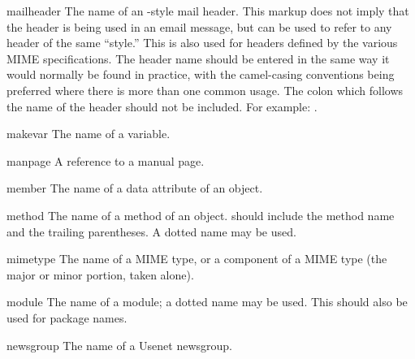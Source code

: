 \documentclass{howto}
\begin{document}
    \begin{macrodesc}{mailheader}{}
      The name of an -style mail header.  This markup does
      not imply that the header is being used in an email message, but
      can be used to refer to any header of the same ``style.''  This
      is also used for headers defined by the various MIME
      specifications.  The header name should be entered in the same
      way it would normally be found in practice, with the
      camel-casing conventions being preferred where there is more
      than one common usage.  The colon which follows the name of the
      header should not be included.
      For example: .
    \end{macrodesc}

    \begin{macrodesc}{makevar}{}
      The name of a  variable.
    \end{macrodesc}

    \begin{macrodesc}{manpage}{}
      A reference to a \UNIX{} manual page.
    \end{macrodesc}

    \begin{macrodesc}{member}{}
      The name of a data attribute of an object.
    \end{macrodesc}

    \begin{macrodesc}{method}{}
      The name of a method of an object.   should include the
      method name and the trailing parentheses.  A dotted name may be
      used.
    \end{macrodesc}

    \begin{macrodesc}{mimetype}{}
      The name of a MIME type, or a component of a MIME type (the
      major or minor portion, taken alone).
    \end{macrodesc}

    \begin{macrodesc}{module}{}
       The name of a module; a dotted name may be used.  This should
       also be used for package names.
    \end{macrodesc}

    \begin{macrodesc}{newsgroup}{}
      The name of a Usenet newsgroup.
    \end{macrodesc}
\end{document}
